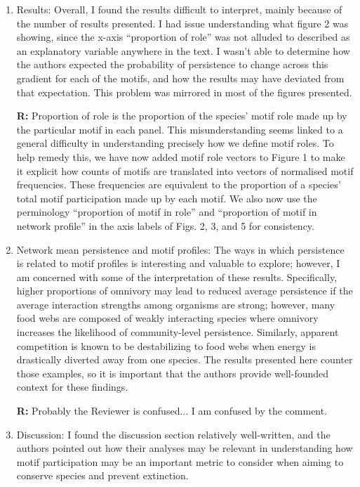 \documentclass[12pt]{article}
\begin{document}
\begin{enumerate}
            \item Results: Overall, I found the results difficult to interpret, mainly because of the number of results presented. I had issue understanding what figure 2 was showing, since the x-axis ``proportion of role'' was not alluded to described as an explanatory variable anywhere in the text. I wasn't able to determine how the authors expected the probability of persistence to change across this gradient for each of the motifs, and how the results may have deviated from that expectation. This problem was mirrored in most of the figures presented.

                \textbf{R:} Proportion of role is the proportion of the species' motif role made up by the particular motif in each panel. This misunderstanding seems linked to a general difficulty in understanding precisely how we define motif roles. To help remedy this, we have now added motif role vectors to Figure 1 to make it explicit how counts of motifs are translated into vectors of normalised motif frequencies. These frequencies are equivalent to the proportion of a species' total motif participation made up by each motif. We also now use the perminology ``proportion of motif in role'' and ``proportion of motif in network profile'' in the axis labels of Figs. 2, 3, and 5 for consistency.


            \item Network mean persistence and motif profiles: The ways in which persistence is related to motif profiles is interesting and valuable to explore; however, I am concerned with some of the interpretation of these results. Specifically, higher proportions of omnivory may lead to reduced average persistence if the average interaction strengths among organisms are strong; however, many food webs are composed of weakly interacting species where omnivory increases the likelihood of community-level persistence. Similarly, apparent competition is known to be destabilizing to food webs when energy is drastically diverted away from one species. The results presented here counter those examples, so it is important that the authors provide well-founded context for these findings.

                \textbf{R:} Probably the Reviewer is confused... I am confused by the comment.


            \item Discussion: I found the discussion section relatively well-written, and the authors pointed out how their analyses may be relevant in understanding how motif participation may be an important metric to consider when aiming to conserve species and prevent extinction.


\end{enumerate}
\end{document}
